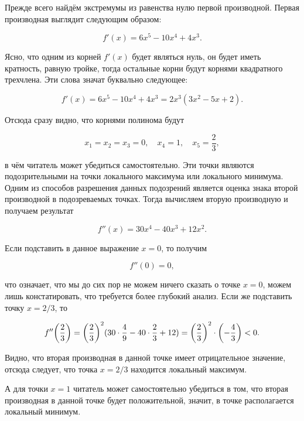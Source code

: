 \documentclass[12pt]{article}
\begin{document}
Прежде всего найдём экстремумы из равенства нулю первой производной. Первая производная выглядит следующим образом:

\begin{equation}
	f'(x) = 6x^5 -10x^4+4x^3.
\end{equation}

Ясно, что одним из корней $f'(x)$ будет являться нуль, он будет иметь кратность, равную тройке, тогда остальные корни будут корнями квадратного трехчлена. Эти слова значат буквально следующее:

\begin{equation}
	f'(x) = 6x^5 -10x^4+4x^3 = 2x^3(3x^2 - 5x + 2).
\end{equation}

Отсюда сразу видно, что корнями полинома будут

\begin{equation}
	x_1 = x_2 = x_3 = 0,\quad x_4 = 1, \quad x_5 = \dfrac{2}{3},
\end{equation}

в чём читатель может убедиться самостоятельно. Эти точки являются подозрительными на точки локального максимума или локального минимума. Одним из способов разрешения данных подозрений является оценка знака второй производной в подозреваемых точках. Тогда вычисляем вторую производную и получаем результат

\begin{equation}
	f''(x) = 30 x^4 -40x^3+12x^2. 
\end{equation}

Если подставить в данное выражение $x=0$, то получим 

\begin{equation}
	f''(0) = 0,
\end{equation}

что означает, что мы до сих пор не можем ничего сказать о точке $x=0$, можем лишь констатировать, что требуется более глубокий анализ. Если же подставить точку $x=2/3$, то 

\begin{equation}
	f''\qty(\dfrac{2}{3}) = \qty(\dfrac{2}{3})^2(30 \cdot \dfrac{4}{9} - 40 \cdot \dfrac{2}{3} + 12) = \qty(\dfrac{2}{3})^2 \cdot \qty(-\dfrac{4}{3}) < 0.
\end{equation}

Видно, что вторая производная в данной точке имеет отрицательное значение, отсюда следует, что точка $x=2/3$ находится локальный максимум.

\par А для точки $x=1$ читатель может самостоятельно убедиться в том, что вторая производная в данной точке будет положительной, значит, в точке располагается локальный минимум.
\end{document}
